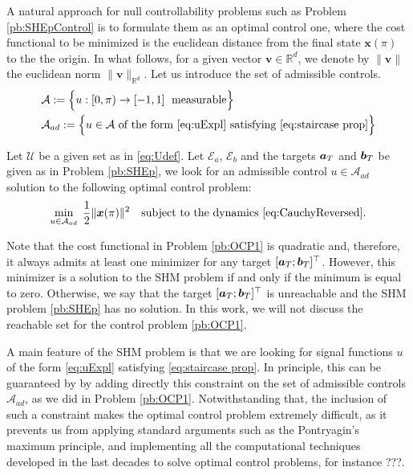 \documentclass[twocolumn]{autart}    %
\begin{document}

A natural approach for null controllability problems such as Problem \ref{pb:SHEpControl} is to formulate them as an optimal control one, where the cost functional to be minimized is the euclidean distance from the final state $\bm{x}(\pi)$ to the the origin. In what follows, for a given vector $\bm{v}\in\mathbb{R}^d$, we  denote by $\|\bm{v}\|$ the euclidean norm $\|\bm{v}\|_{\mathbb{R}^d}$.  
Let us introduce the set of admissible controls.
\begin{align*}
	&\mathcal A:= \Big\{u:[0,\pi)\to [-1,1]\; \text{ measurable}\Big\}
	\\
	&\mathcal A_{ad}:= \Big\{u\in\mathcal A \text{ of the form } \eqref{eq:uExpl} \text{ satisfying } \eqref{eq:staircase prop}\Big\}
\end{align*}


\begin{problem}\label{pb:OCP1}
Let $\mathcal{U}$ be a given set as in \eqref{eq:Udef}. Let $\mathcal{E}_a$, $\mathcal{E}_b$ and the targets $\bm{a}_T$ and $\bm{b}_T$ be given as in Problem \ref{pb:SHEp}, we look for an admissible control $u\in \mathcal{A}_{ad}$ solution to the following optimal control problem:
\begin{equation*}
	\min_{u \in \mathcal{A}_{ad}}\;\frac 12 \|\bm{x}(\pi)\|^2 \quad \text{subject to the dynamics \eqref{eq:CauchyReversed}}.
\end{equation*}
\end{problem}

\begin{remark}
Note that the cost functional in Problem \ref{pb:OCP1} is quadratic and, therefore, it always admits at least one minimizer for any target $[\bm{a}_T;\bm{b}_T]^\top$. However, this minimizer is a solution to the SHM problem if and only if the minimum is equal to zero. Otherwise, we say that the target $[\bm{a}_T;\bm{b}_T]^\top$ is unreachable and the SHM problem \ref{pb:SHEp} has no solution.  In this work, we will not discuss the reachable set for the control problem \eqref{pb:OCP1}.
\end{remark}

A main feature of the SHM problem is that we are looking for signal functions $u$ of the form \eqref{eq:uExpl} satisfying \eqref{eq:staircase prop}. In principle, this can be guaranteed by by adding directly this constraint on the set of admissible controls $\mathcal{A}_{ad}$, as we did in Problem \ref{pb:OCP1}. Notwithstanding that, the inclusion of such a constraint makes the optimal control problem extremely difficult, as it prevents us from applying standard arguments such as the Pontryagin's maximum principle, and implementing all the computational techniques developed in the last decades to solve optimal control problems, {\color{red} for instance ???}. %
\end{document}
